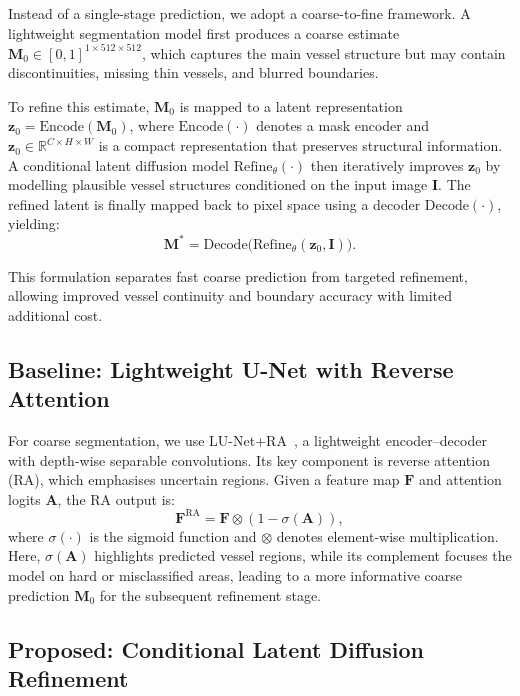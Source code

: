 \documentclass[journal,article,submit,pdftex,moreauthors]{Definitions/mdpi}
\begin{document}
Instead of a single-stage prediction, we adopt a coarse-to-fine framework. A lightweight segmentation model first produces a coarse estimate $\mathbf{M}_0\in[0,1]^{1\times512\times512}$, which captures the main vessel structure but may contain discontinuities, missing thin vessels, and blurred boundaries.

To refine this estimate, $\mathbf{M}_0$ is mapped to a latent representation $\mathbf{z}_0=\mathrm{Encode}(\mathbf{M}_0)$, where $\mathrm{Encode}(\cdot)$ denotes a mask encoder and $\mathbf{z}_0\in\mathbb{R}^{C\times H\times W}$ is a compact representation that preserves structural information. A conditional latent diffusion model $\mathrm{Refine}_{\theta}(\cdot)$ then iteratively improves $\mathbf{z}_0$ by modelling plausible vessel structures conditioned on the input image $\mathbf{I}$. The refined latent is finally mapped back to pixel space using a decoder $\mathrm{Decode}(\cdot)$, yielding:
\begin{equation}
\mathbf{M}^* = \mathrm{Decode}\big(\mathrm{Refine}_{\theta}(\mathbf{z}_0, \mathbf{I})\big).
\end{equation}

This formulation separates fast coarse prediction from targeted refinement, allowing improved vessel continuity and boundary accuracy with limited additional cost.

\subsection{Baseline: Lightweight U-Net with Reverse Attention}

For coarse segmentation, we use LU-Net+RA~\cite{Hernandez2025}, a lightweight encoder--decoder with depth-wise separable convolutions. Its key component is reverse attention (RA), which emphasises uncertain regions. Given a feature map $\mathbf{F}$ and attention logits $\mathbf{A}$, the RA output is:
\begin{equation}
\mathbf{F}^{\text{RA}} = \mathbf{F}\otimes \left(1-\sigma(\mathbf{A})\right),
\end{equation}
where $\sigma(\cdot)$ is the sigmoid function and $\otimes$ denotes element-wise multiplication. Here, $\sigma(\mathbf{A})$ highlights predicted vessel regions, while its complement focuses the model on hard or misclassified areas, leading to a more informative coarse prediction $\mathbf{M}_0$ for the subsequent refinement stage. 


\subsection{Proposed: Conditional Latent Diffusion Refinement}
\end{document}
